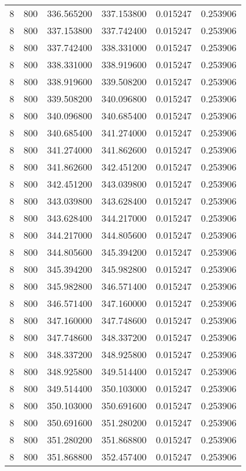 \begin{longtable}{rrrrrr}
8 & 800 & 336.565200 & 337.153800 & 0.015247 & 0.253906 \\
8 & 800 & 337.153800 & 337.742400 & 0.015247 & 0.253906 \\
8 & 800 & 337.742400 & 338.331000 & 0.015247 & 0.253906 \\
8 & 800 & 338.331000 & 338.919600 & 0.015247 & 0.253906 \\
8 & 800 & 338.919600 & 339.508200 & 0.015247 & 0.253906 \\
8 & 800 & 339.508200 & 340.096800 & 0.015247 & 0.253906 \\
8 & 800 & 340.096800 & 340.685400 & 0.015247 & 0.253906 \\
8 & 800 & 340.685400 & 341.274000 & 0.015247 & 0.253906 \\
8 & 800 & 341.274000 & 341.862600 & 0.015247 & 0.253906 \\
8 & 800 & 341.862600 & 342.451200 & 0.015247 & 0.253906 \\
8 & 800 & 342.451200 & 343.039800 & 0.015247 & 0.253906 \\
8 & 800 & 343.039800 & 343.628400 & 0.015247 & 0.253906 \\
8 & 800 & 343.628400 & 344.217000 & 0.015247 & 0.253906 \\
8 & 800 & 344.217000 & 344.805600 & 0.015247 & 0.253906 \\
8 & 800 & 344.805600 & 345.394200 & 0.015247 & 0.253906 \\
8 & 800 & 345.394200 & 345.982800 & 0.015247 & 0.253906 \\
8 & 800 & 345.982800 & 346.571400 & 0.015247 & 0.253906 \\
8 & 800 & 346.571400 & 347.160000 & 0.015247 & 0.253906 \\
8 & 800 & 347.160000 & 347.748600 & 0.015247 & 0.253906 \\
8 & 800 & 347.748600 & 348.337200 & 0.015247 & 0.253906 \\
8 & 800 & 348.337200 & 348.925800 & 0.015247 & 0.253906 \\
8 & 800 & 348.925800 & 349.514400 & 0.015247 & 0.253906 \\
8 & 800 & 349.514400 & 350.103000 & 0.015247 & 0.253906 \\
8 & 800 & 350.103000 & 350.691600 & 0.015247 & 0.253906 \\
8 & 800 & 350.691600 & 351.280200 & 0.015247 & 0.253906 \\
8 & 800 & 351.280200 & 351.868800 & 0.015247 & 0.253906 \\
8 & 800 & 351.868800 & 352.457400 & 0.015247 & 0.253906 \\

\end{longtable}
